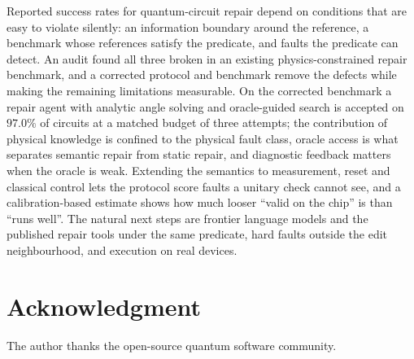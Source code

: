 \documentclass[journal]{IEEEtran}
\begin{document}
Reported success rates for quantum-circuit repair depend on conditions that are
easy to violate silently: an information boundary around the reference, a
benchmark whose references satisfy the predicate, and faults the predicate can
detect. An audit found all three broken in an existing physics-constrained
repair benchmark, and a corrected protocol and benchmark remove the defects
while making the remaining limitations measurable. On the corrected benchmark a
repair agent with analytic angle solving and oracle-guided search is accepted on
$97.0\%$ of circuits at a matched budget of three attempts; the contribution of
physical knowledge is confined to the physical fault class, oracle access is
what separates semantic repair from static repair, and diagnostic feedback
matters when the oracle is weak. Extending the semantics to measurement, reset and classical
control lets the protocol score faults a unitary check cannot see, and a calibration-based
estimate shows how much looser ``valid on the chip'' is than ``runs well''. The natural next
steps are frontier language models and the published repair tools under the same predicate,
hard faults outside the edit neighbourhood, and execution on real devices.

\section*{Acknowledgment}

The author thanks the open-source quantum software community.



\end{document}
